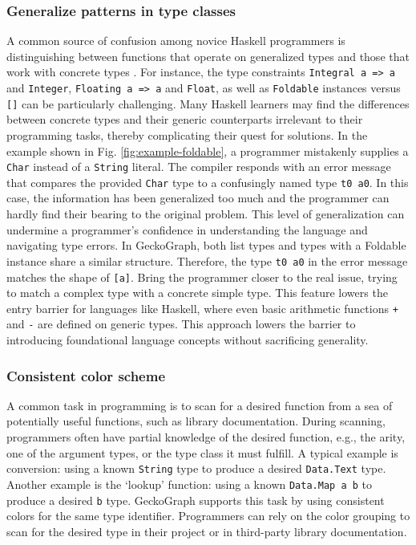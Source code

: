 \documentclass[preprint,12pt]{elsarticle}
\begin{document}
\subsubsection{Generalize patterns in type classes}
A common source of confusion among novice Haskell programmers is distinguishing between functions that operate on generalized types and those that work with concrete types \cite{Tirronen2015-nr}. For instance, the type constraints {\tt Integral a => a} and {\tt Integer}, {\tt Floating a => a} and {\tt Float}, as well as {\tt Foldable} instances versus {\tt []} can be particularly challenging. Many Haskell learners may find the differences between concrete types and their generic counterparts irrelevant to their programming tasks, thereby complicating their quest for solutions. In the example shown in Fig. \ref{fig:example-foldable}, a programmer mistakenly supplies a \texttt{Char} instead of a \texttt{String} literal. The compiler responds with an error message that compares the provided \texttt{Char} type to a confusingly named type \texttt{t0 a0}. In this case, the information has been generalized too much and the programmer can hardly find their bearing to the original problem. This level of generalization can undermine a programmer's confidence in understanding the language and navigating type errors. In GeckoGraph, both list types and types with a Foldable instance share a similar structure. Therefore, the type \texttt{t0 a0} in the error message matches the shape of \texttt{[a]}. Bring the programmer closer to the real issue, trying to match a complex type with a concrete simple type. This feature lowers the entry barrier for languages like Haskell, where even basic arithmetic functions {\tt +} and {\tt -} are defined on generic types. This approach lowers the barrier to introducing foundational language concepts without sacrificing generality.

\subsubsection{Consistent color scheme}\label{par:color-scheme}
A common task in programming is to scan for a desired function from a sea of potentially useful functions, such as library documentation. During scanning, programmers often have partial knowledge of the desired function, e.g., the arity, one of the argument types, or the type class it must fulfill.  A typical example is conversion: using a known \texttt{String} type to produce a desired \texttt{Data.Text}  type. Another example is the `lookup' function: using a known \texttt{Data.Map a b} to produce a desired \texttt{b} type. GeckoGraph supports this task by using consistent colors for the same type identifier. Programmers can rely on the color grouping to scan for the desired type in their project or in third-party library documentation.
\end{document}
